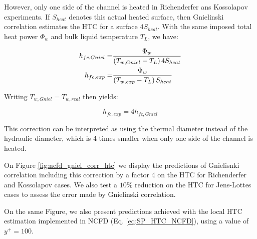 However, only one side of the channel is heated in Richenderfer ans Kossolapov experiments. If $S_{heat}$ denotes this actual heated surface, then Gnielinski correlation estimates the HTC for a surface $4S_{heat}$. With the same imposed total heat power $\Phi_{w}$ and bulk liquid temperature $T_{L}$, we have:

\begin{align}
h_{fc,Gniel} =& \frac{\Phi_{w}}{\left( T_{w,Gniel}-T_{L} \right) 4S_{heat}} \\
h_{fc,exp} =& \frac{\Phi_{w}}{\left( T_{w,exp}-T_{L} \right) S_{heat}}
\end{align}

Writing $T_{w,Gniel}=T_{w,real}$ then yields:

\begin{equation}
h_{fc,exp}=4h_{fc,Gniel}
\end{equation}

\begin{remark*}{}
This correction can be interpreted as using the thermal diameter instead of the hydraulic diameter, which is 4 times smaller when only one side of the channel is heated.
\end{remark*}

On Figure \ref{fig:ncfd_gniel_corr_htc} we display the predictions of Gnielisnki correlation including this correction by a factor 4 on the HTC for Richenderfer and Kossolapov cases. We also test a $10\%$ reduction on the HTC for Jens-Lottes cases to assess the error made by Gnielinski correlation.

On the same Figure, we also present predictions achieved with the local HTC estimation implemented in NCFD (Eq. \ref{eq:SP_HTC_NCFD}), using a value of $y^{+}=100$. 


